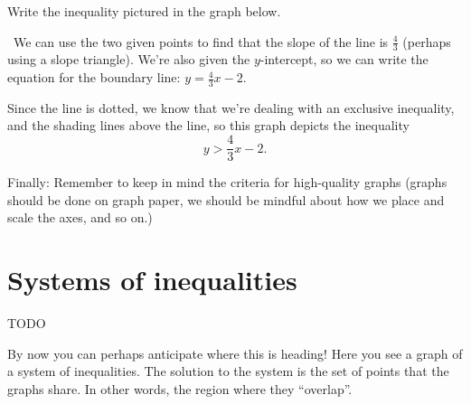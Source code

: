 \begin{boxedex}
Write the inequality pictured in the graph below.

\begin{center}
\end{center}

\exsoln\ We can use the two given points to find that the slope of the line is $\frac{4}{3}$ (perhaps using a slope triangle). We're also given the $y$-intercept, so we can write the equation for the boundary line: $y=\frac{4}{3}x-2$.

Since the line is dotted, we know that we're dealing with an exclusive inequality, and the shading lines above the line, so this graph depicts the inequality \[y > \frac{4}{3}x-2.\]
\end{boxedex}

Finally: Remember to keep in mind the criteria for high-quality graphs (graphs should be done on graph paper, we should be mindful about how we place and scale the axes, and so on.)

\section{Systems of inequalities}
\label{sec:ineqsystems}

\begin{boxedexplore}
TODO
\end{boxedexplore}

By now you can perhaps anticipate where this is heading! Here you see a graph of a system of inequalities. The solution to the system is the set of points that the graphs share. In other words, the region where they ``overlap''.

\begin{center}
\end{center}

